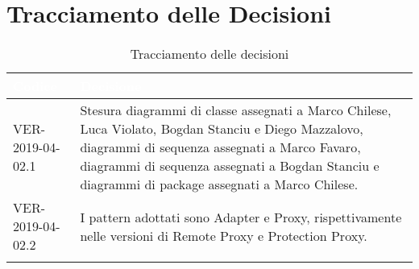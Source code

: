 \newpage
\section{Tracciamento delle Decisioni}

\begin{longtable}{|C{.40\textwidth}|C{.60\textwidth}|}
\hline
{}\textbf{\textcolor{white}{Codice}} & \textbf{\textcolor{white}{Decisione}}\\
\hline
VER-2019-04-02.1 & Stesura diagrammi di classe assegnati a Marco Chilese, Luca Violato, Bogdan Stanciu e Diego Mazzalovo, diagrammi di sequenza assegnati a Marco Favaro, diagrammi di sequenza assegnati a Bogdan Stanciu e diagrammi di package assegnati a Marco Chilese. \\
\hline
{}VER-2019-04-02.2 & I pattern adottati sono Adapter e Proxy, rispettivamente nelle versioni di Remote Proxy e Protection Proxy. \\
\hline

\caption{Tracciamento delle decisioni}
\end{longtable}
